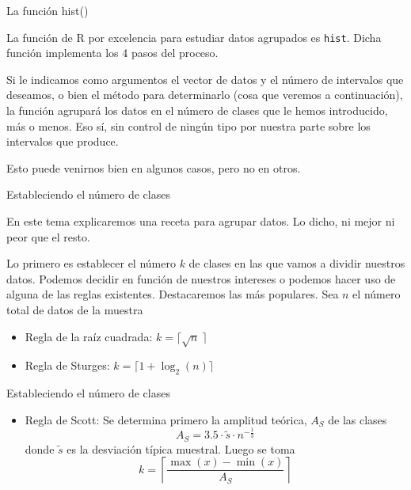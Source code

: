 \documentclass[
  ignorenonframetext,
]{beamer}
\providecommand{\tightlist}{%
  \setlength{\itemsep}{0pt}\setlength{\parskip}{0pt}}
\begin{document}
\begin{frame}[fragile]{La función hist()}
\protect\hypertarget{la-funciuxf3n-hist}{}

La función de R por excelencia para estudiar datos agrupados es
\texttt{hist}. Dicha función implementa los 4 pasos del proceso.

Si le indicamos como argumentos el vector de datos y el número de
intervalos que deseamos, o bien el método para determinarlo (cosa que
veremos a continuación), la función agrupará los datos en el número de
clases que le hemos introducido, más o menos. Eso sí, sin control de
ningún tipo por nuestra parte sobre los intervalos que produce.

Esto puede venirnos bien en algunos casos, pero no en otros.

\end{frame}

\begin{frame}{Estableciendo el número de clases}
\protect\hypertarget{estableciendo-el-nuxfamero-de-clases}{}

En este tema explicaremos una receta para agrupar datos. Lo dicho, ni
mejor ni peor que el resto.

Lo primero es establecer el número \(k\) de clases en las que vamos a
dividir nuestros datos. Podemos decidir en función de nuestros intereses
o podemos hacer uso de alguna de las reglas existentes. Destacaremos las
más populares. Sea \(n\) el número total de datos de la muestra

\begin{itemize}
\tightlist
\item
  Regla de la raíz cuadrada: \(k = \lceil\sqrt{n}\ \rceil\)
\item
  Regla de Sturges: \(k = \lceil 1+\log_{2}(n)\rceil\)
\end{itemize}

\end{frame}

\begin{frame}{Estableciendo el número de clases}
\protect\hypertarget{estableciendo-el-nuxfamero-de-clases-1}{}

\begin{itemize}
\tightlist
\item
  Regla de Scott: Se determina primero la amplitud teórica, \(A_S\) de
  las clases \[A_S = 3.5\cdot\tilde{s}\cdot n^{-\frac{1}{3}}\] donde
  \(\tilde{s}\) es la desviación típica muestral. Luego se toma
  \[k = \left\lceil \frac{\max(x)-\min(x)}{A_S}\right\rceil\]
\end{itemize}

\end{frame}
\end{document}
